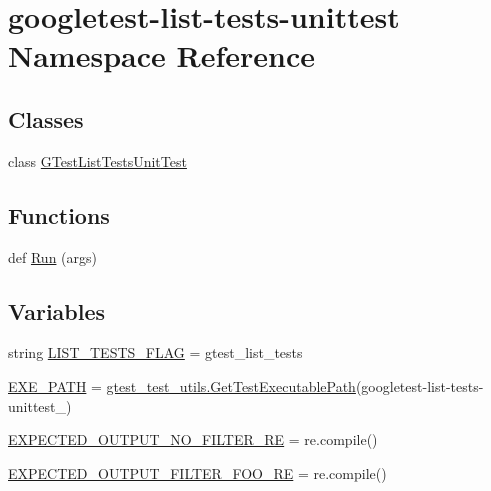 \hypertarget{namespacegoogletest-list-tests-unittest}{}\section{googletest-\/list-\/tests-\/unittest Namespace Reference}
\label{namespacegoogletest-list-tests-unittest}
\subsection*{Classes}
\begin{DoxyCompactItemize}
\item 
class \mbox{\hyperlink{classgoogletest-list-tests-unittest_1_1GTestListTestsUnitTest}{G\+Test\+List\+Tests\+Unit\+Test}}
\end{DoxyCompactItemize}
\subsection*{Functions}
\begin{DoxyCompactItemize}
\item 
def \mbox{\hyperlink{namespacegoogletest-list-tests-unittest_a9e03b1bb25b16376b25e53a1927be5da}{Run}} (args)
\end{DoxyCompactItemize}
\subsection*{Variables}
\begin{DoxyCompactItemize}
\item 
string \mbox{\hyperlink{namespacegoogletest-list-tests-unittest_a0ed7b4792af42a3e286c09f42094659c}{L\+I\+S\+T\+\_\+\+T\+E\+S\+T\+S\+\_\+\+F\+L\+AG}} = \textquotesingle{}gtest\+\_\+list\+\_\+tests\textquotesingle{}
\item 
\mbox{\hyperlink{namespacegoogletest-list-tests-unittest_add30c7a45a9cc216146c8b152e2c3455}{E\+X\+E\+\_\+\+P\+A\+TH}} = \mbox{\hyperlink{namespacegtest__test__utils_a89ed3717984a80ffbb7a9c92f71b86a2}{gtest\+\_\+test\+\_\+utils.\+Get\+Test\+Executable\+Path}}(\textquotesingle{}googletest-\/list-\/tests-\/unittest\+\_\+\textquotesingle{})
\item 
\mbox{\hyperlink{namespacegoogletest-list-tests-unittest_abb2df597e07f0ba056b4a1d6109fd99f}{E\+X\+P\+E\+C\+T\+E\+D\+\_\+\+O\+U\+T\+P\+U\+T\+\_\+\+N\+O\+\_\+\+F\+I\+L\+T\+E\+R\+\_\+\+RE}} = re.\+compile()
\item 
\mbox{\hyperlink{namespacegoogletest-list-tests-unittest_aede0392cd15434ad8392838a94c29c5e}{E\+X\+P\+E\+C\+T\+E\+D\+\_\+\+O\+U\+T\+P\+U\+T\+\_\+\+F\+I\+L\+T\+E\+R\+\_\+\+F\+O\+O\+\_\+\+RE}} = re.\+compile()
\end{DoxyCompactItemize}


